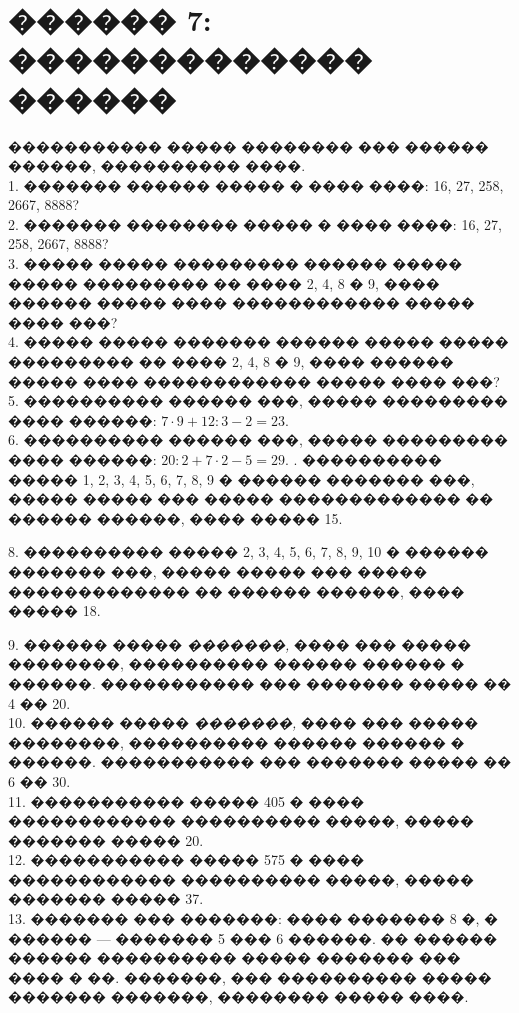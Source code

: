 \documentclass[12pt]{article}
\begin{document}
\section{������ 7: ������������� ������}
����������� ����� �������� ��� ������ ������, ���������� ����.\\
1. ������� ������ ����� � ���� ����: 16, 27, 258, 2667, 8888?\\
2. ������� �������� ����� � ���� ����: 16, 27, 258, 2667, 8888?\\
3. ����� ����� ��������� ������ ����� ����� ��������� �� ���� 2, 4, 8 � 9, ���� ������ ����� ���� ������������ ����� ���� ���?\\
4. ����� ����� ������� ������ ����� ����� ��������� �� ���� 2, 4, 8 � 9, ���� ������ ����� ���� ������������ ����� ���� ���?\\
5. ���������� ������ ���, ����� ��������� ���� ������: $7\cdot9+12:3-2=23.$\\
6. ���������� ������ ���, ����� ��������� ���� ������: $20:2+7\cdot2-5=29.$
\newpage
{}. ���������� ����� 1, 2, 3, 4, 5, 6, 7, 8, 9 � ������ ������� ���, ����� ����� ��� ����� ������������� �� ������ ������, ���� ����� 15.
\begin{center}
\begin{figure}[h!]
\end{figure}
\end{center}
8. ���������� ����� 2, 3, 4, 5, 6, 7, 8, 9, 10 � ������ ������� ���, ����� ����� ��� ����� ������������� �� ������ ������, ���� ����� 18.
\begin{center}
\begin{figure}[h!]
\end{figure}
\end{center}
9. ������ ����� {\it �������,} ���� ��� ����� ��������, ���������� ������ ������ � ������. ����������� ��� ������� ����� �� 4 �� 20.\\
10. ������ ����� {\it �������,} ���� ��� ����� ��������, ���������� ������ ������ � ������. ����������� ��� ������� ����� �� 6 �� 30.\\
11. ����������� ����� 405 � ���� ������������ ���������� �����, ����� ������� ����� 20.\\
12. ����������� ����� 575 � ���� ������������ ���������� �����, ����� ������� ����� 37.\\
13. ������� ��� �������: ���� ������� 8 �, � ������ --- ������� 5 ��� 6 ������. �� ������ ������ ���������� ����� ������� ��� ���� � ��. �������, ��� ���������� ����� ������� �������, �������� ����� ����.\\
\end{document}
